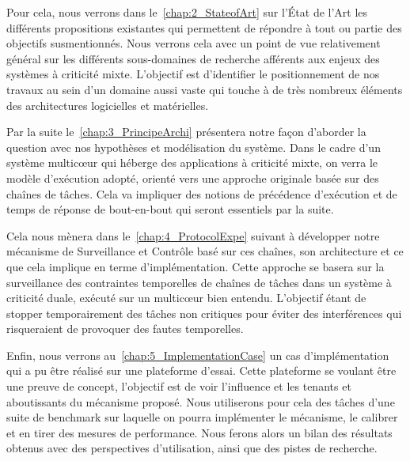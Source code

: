 \documentclass[french, a4paper, 11pt, twoside, pdftex]{StyleThese}
\begin{document}
	Pour cela, nous verrons dans le~\autoref{chap:2_StateofArt} sur l'État de l'Art les différents propositions existantes qui permettent de répondre à tout ou partie des objectifs susmentionnés. Nous verrons cela avec un point de vue relativement général sur les différents sous-domaines de recherche afférents aux enjeux des systèmes à criticité mixte. L'objectif est d'identifier le positionnement de nos travaux au sein d'un domaine aussi vaste qui touche à de très nombreux éléments des architectures logicielles et matérielles.  %
	
	Par la suite le~\autoref{chap:3_PrincipeArchi} présentera notre façon d'aborder la question avec nos hypothèses et modélisation du système. Dans le cadre d'un système multicœur qui héberge des applications à criticité mixte, on verra le modèle d'exécution adopté, orienté vers une approche originale basée sur des chaînes de tâches. Cela va impliquer des notions de précédence d'exécution et de temps de réponse de bout-en-bout qui seront essentiels par la suite.
	
	Cela nous mènera dans le~\autoref{chap:4_ProtocolExpe} suivant à développer notre mécanisme de Surveillance et Contrôle basé sur ces chaînes, son architecture et ce que cela implique en terme d'implémentation. Cette approche se basera sur la surveillance des contraintes temporelles de chaînes de tâches dans un système à criticité duale, exécuté sur un multicœur bien entendu. L'objectif étant de stopper temporairement des tâches non critiques pour éviter des interférences qui risqueraient de provoquer des fautes temporelles.
	
	Enfin, nous verrons au~\autoref{chap:5_ImplementationCase} un cas d'implémentation qui a pu être réalisé sur une plateforme d'essai. Cette plateforme se voulant être une preuve de concept, l'objectif est de voir l'influence et les tenants et aboutissants du mécanisme proposé. Nous utiliserons pour cela des tâches d'une suite de benchmark sur laquelle on pourra implémenter le mécanisme, le calibrer et en tirer des mesures de performance.
	Nous ferons alors un bilan des résultats obtenus avec des perspectives d'utilisation, ainsi que des pistes de recherche. 
    



\ifdefined{}
\else


\end{document}
